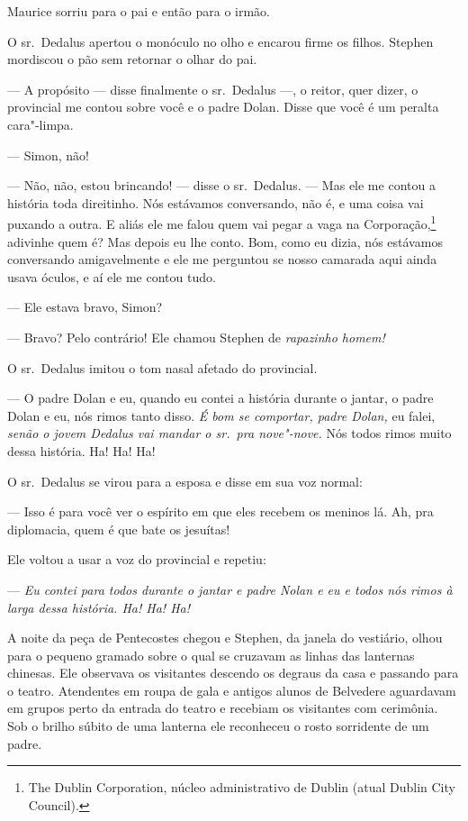 Maurice sorriu para o pai e então para o irmão.

O sr.~Dedalus apertou o monóculo no olho e encarou firme os filhos.
Stephen mordiscou o pão sem retornar o olhar do pai.                 

 --- A propósito --- disse finalmente o sr.~Dedalus ---, o reitor, quer dizer, o
provincial me contou sobre você e o padre Dolan. Disse que você é um
peralta cara"-limpa.

 --- Simon, não!

 --- Não, não, estou brincando! --- disse o sr.~Dedalus. --- Mas ele me contou a
história toda direitinho. Nós estávamos conversando, não é, e uma coisa
vai puxando a outra. E aliás ele me falou quem vai pegar a vaga na
Corporação,\footnote{ The Dublin Corporation, núcleo administrativo de
Dublin (atual Dublin City Council).} adivinhe quem é? Mas depois eu
lhe conto. Bom, como eu dizia, nós estávamos conversando amigavelmente
e ele me perguntou se nosso camarada aqui ainda usava óculos, e aí ele
me contou tudo.

 --- Ele estava bravo, Simon?

 --- Bravo? Pelo contrário! Ele chamou Stephen de \textit{rapazinho homem!}

O sr.~Dedalus imitou o tom nasal afetado do provincial.

 --- O padre Dolan e eu, quando eu contei a história durante o jantar, o
padre Dolan e eu, nós rimos tanto disso. \textit{É bom se comportar,
padre Dolan,} eu falei,\textit{ senão o jovem Dedalus vai mandar o sr.~pra nove"-nove.} 
Nós todos rimos muito dessa história. Ha! Ha! Ha!

O sr.~Dedalus se virou para a esposa e disse em sua voz normal:

 --- Isso é para você ver o espírito em que eles recebem os meninos lá. Ah,
pra diplomacia, quem é que bate os jesuítas!

Ele voltou a usar a voz do provincial e repetiu:

 --- \textit{Eu contei para todos durante o jantar e padre Nolan e eu e
todos nós rimos à larga dessa história. Ha! Ha! Ha!}

\asterisc

A noite da peça de Pentecostes chegou e Stephen, da janela do vestiário,
olhou para o pequeno gramado sobre o qual se cruzavam as linhas das
lanternas chinesas. Ele observava os visitantes descendo os degraus da
casa e passando para o teatro. Atendentes em roupa de gala e antigos
alunos de Belvedere aguardavam em grupos perto da entrada do teatro e
recebiam os visitantes com cerimônia. Sob o brilho súbito de uma
lanterna ele reconheceu o rosto sorridente de um padre.

